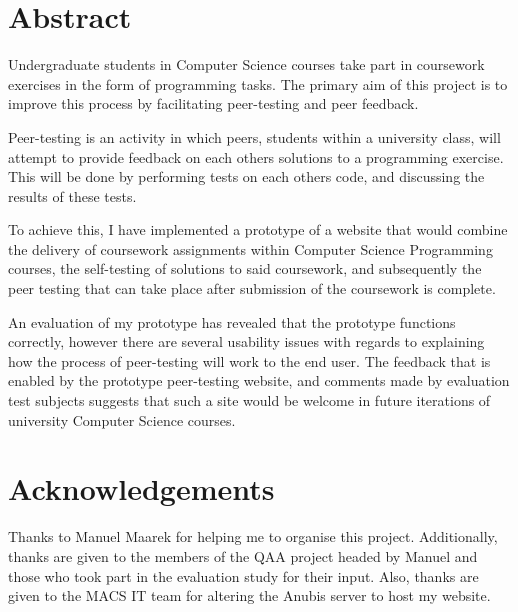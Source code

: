 \documentclass[a4paper,11pt]{report}
\begin{document}
\section*{Abstract}
Undergraduate students in Computer Science courses take part in coursework exercises in the form of programming tasks. The primary aim of this project is to improve this process by facilitating peer-testing and peer feedback.\par
Peer-testing is an activity in which peers, students within a university class, will attempt to provide feedback on each others solutions to a programming exercise. This will be done by performing tests on each others code, and discussing the results of these tests.\par
To achieve this, I have implemented a prototype of a website that would combine the delivery of coursework assignments within Computer Science Programming courses, the self-testing of solutions to said coursework, and subsequently the peer testing that can take place after submission of the coursework is complete.\par
An evaluation of my prototype has revealed that the prototype functions correctly, however there are several usability issues with regards to explaining how the process of peer-testing will work to the end user. The feedback that is enabled by the prototype peer-testing website, and comments made by evaluation test subjects suggests that such a site would be welcome in future iterations of university Computer Science courses.

\newpage

\section*{Acknowledgements}
Thanks to Manuel Maarek for helping me to organise this project. Additionally, thanks are given to the members of the QAA project headed by Manuel and those who took part in the evaluation study for their input. Also, thanks are given to the MACS IT team for altering the Anubis server to host my website.

\newpage

\pagestyle{headings}



\end{document}

